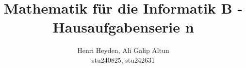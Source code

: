 \documentclass[12pt, a4paper]{article}
\title{Mathematik für die Informatik B - Hausaufgabenserie n}
\author{Henri Heyden, Ali Galip Altun \\ \small stu240825, stu242631}
\date{}
\begin{document}
\maketitle


\doublespacing
\end{document}

